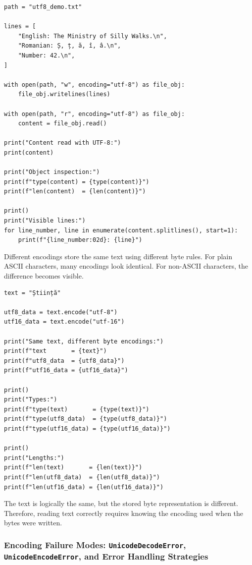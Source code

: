 \begin{verbatim}
path = "utf8_demo.txt"

lines = [
    "English: The Ministry of Silly Walks.\n",
    "Romanian: Ș, ț, ă, î, â.\n",
    "Number: 42.\n",
]

with open(path, "w", encoding="utf-8") as file_obj:
    file_obj.writelines(lines)

with open(path, "r", encoding="utf-8") as file_obj:
    content = file_obj.read()

print("Content read with UTF-8:")
print(content)

print("Object inspection:")
print(f"type(content) = {type(content)}")
print(f"len(content)  = {len(content)}")

print()
print("Visible lines:")
for line_number, line in enumerate(content.splitlines(), start=1):
    print(f"{line_number:02d}: {line}")
\end{verbatim}

Different encodings store the same text using different byte rules. For plain ASCII characters, many encodings look identical. For non-ASCII characters, the difference becomes visible.

\begin{verbatim}
text = "Știință"

utf8_data = text.encode("utf-8")
utf16_data = text.encode("utf-16")

print("Same text, different byte encodings:")
print(f"text       = {text}")
print(f"utf8_data  = {utf8_data}")
print(f"utf16_data = {utf16_data}")

print()
print("Types:")
print(f"type(text)       = {type(text)}")
print(f"type(utf8_data)  = {type(utf8_data)}")
print(f"type(utf16_data) = {type(utf16_data)}")

print()
print("Lengths:")
print(f"len(text)       = {len(text)}")
print(f"len(utf8_data)  = {len(utf8_data)}")
print(f"len(utf16_data) = {len(utf16_data)}")
\end{verbatim}

The text is logically the same, but the stored byte representation is different. Therefore, reading text correctly requires knowing the encoding used when the bytes were written.

\subsubsection{Encoding Failure Modes: \texttt{UnicodeDecodeError}, \texttt{UnicodeEncodeError}, and Error Handling Strategies}

